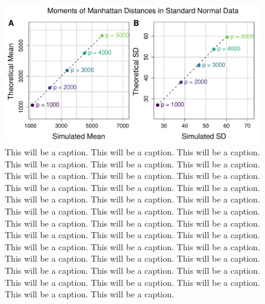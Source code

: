 \documentclass[10pt,letterpaper]{article}\usepackage[]{graphicx}\usepackage[]{color}
\begin{document}
\begin{figure}[H]
	\includegraphics[width=\textwidth]{compared_moments_normal_manhattan_standard.pdf}
	\caption{This will be a caption. This will be a caption. This will be a caption. This will be a caption. This will be a caption. This will be a caption. This will be a caption. This will be a caption. This will be a caption. This will be a caption. This will be a caption. This will be a caption. This will be a caption. This will be a caption. This will be a caption. This will be a caption. This will be a caption. This will be a caption. This will be a caption. This will be a caption. This will be a caption. This will be a caption. This will be a caption. This will be a caption. This will be a caption. This will be a caption. This will be a caption. This will be a caption. This will be a caption. This will be a caption. This will be a caption. This will be a caption. This will be a caption. This will be a caption. This will be a caption. This will be a caption. This will be a caption. This will be a caption.}
\end{figure}
\end{document}
